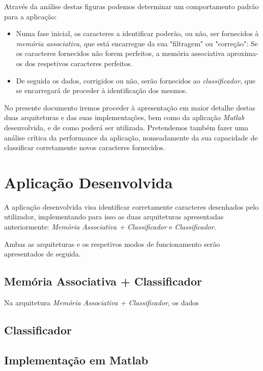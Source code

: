 \documentclass{article}
\begin{document}
Através da análise destas figuras podemos determinar um comportamento padrão para a aplicação:

\begin{itemize}
\item Numa fase inicial, os caracteres a identificar poderão, ou não, ser fornecidos à \emph{memória associativa}, que está encarregue da sua "filtragem" ou "correção": Se os caracteres fornecidos não forem perfeitos, a memória associativa aproxima-os dos respetivos caracteres perfeitos.

\item De seguida os dados, corrigidos ou não, serão fornecidos ao \emph{classificador}, que se encarregará de proceder à identificação dos mesmos.
\end{itemize}

No presente documento iremos proceder à apresentação em maior detalhe destas duas arquiteturas e das suas implementações, bem como da aplicação \emph{Matlab} desenvolvida, e de como poderá ser utilizada. Pretendemos também fazer uma análise crítica da performance da aplicação, nomeadamente da sua capacidade de classificar corretamente novos caracteres fornecidos.

\pagebreak

\section{Aplicação Desenvolvida}

A aplicação desenvolvida visa identificar corretamente caracteres desenhados pelo utilizador, implementando para isso as duas arquiteturas apresentadas anteriormente: \emph{Memória Associativa + Classificador} e \emph{Classificador}.

Ambas as arquiteturas e os respetivos modos de funcionamento serão apresentados de seguida.

\subsection{Memória Associativa + Classificador}

Na arquitetura \emph{Memória Associativa + Classificador}, os dados 

\subsection{Classificador}

\pagebreak

\subsection{Implementação em Matlab}
\end{document}
